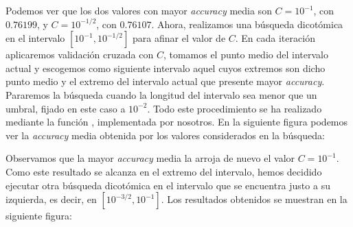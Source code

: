 \documentclass[a4]{article}
\begin{document}
\begin{figure}[H]
    \centering
	\label{fig:log_reg_cv1}
\end{figure}

Podemos ver que los dos valores con mayor \textit{accuracy} media son $C=10^{-1}$, con $0.76199$, y $C=10^{-1/2}$, con $0.76107$. Ahora, realizamos una búsqueda dicotómica en el intervalo $[10^{-1}, 10^{-1/2}]$ para afinar el valor de $C$. En cada iteración aplicaremos validación cruzada con $C$, tomamos el punto medio del intervalo actual y escogemos como siguiente intervalo aquel cuyos extremos son dicho punto medio y el extremo del intervalo actual que presente mayor \textit{accuracy}. Pararemos la búsqueda cuando la longitud del intervalo sea menor que un umbral, fijado en este caso a $10^{-2}$. Todo este procedimiento se ha realizado mediante la función , implementada por nosotros. En la siguiente figura podemos ver la \textit{accuracy} media obtenida por los valores considerados en la búsqueda:

\begin{figure}[H]
    \centering
	\label{fig:log_reg_cv2}
\end{figure}

Observamos que la mayor \textit{accuracy} media la arroja de nuevo el valor $C=10^{-1}$. Como este resultado se alcanza en el extremo del intervalo, hemos decidido ejecutar otra búsqueda dicotómica en el intervalo que se encuentra justo a su izquierda, es decir, en $[10^{-3/2},10^{-1}]$. Los resultados obtenidos se muestran en la siguiente figura:
\end{document}
